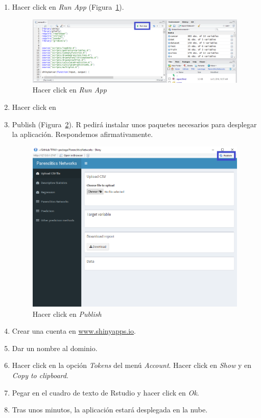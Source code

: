 \begin{enumerate}
	\item Hacer click en \textit{Run App} (Figura~\ref{fig:runapp}).
	
	\begin{figure}[htbp!]
		\centering
		\includegraphics[width=0.7\linewidth]{imagenes/runapp}
		\caption{Hacer click en \textit{Run App}}
		\label{fig:runapp}
	\end{figure}
	
	\item Hacer click en \item{Publish} (Figura~\ref{fig:publish}). R pedirá instalar unos paquetes necesarios para desplegar la aplicación. Respondemos afirmativamente.
	
	\begin{figure}[htbp!]
		\centering
		\includegraphics[width=0.7\linewidth]{imagenes/publish}
		\caption{Hacer click en \textit{Publish}}
		\label{fig:publish}
	\end{figure}
	
	\item Crear una cuenta en \url{www.shinyapps.io}.
	
	\item Dar un nombre al dominio.
	
	\item Hacer click en la opción \textit{Tokens} del menú \textit{Account}. Hacer click en \textit{Show} y en \textit{Copy to clipboard}.
	
	\item Pegar en el cuadro de texto de Rstudio y hacer click en \textit{Ok}.
	
	\item Tras unos minutos, la aplicación estará desplegada en la nube.
	
\end{enumerate}